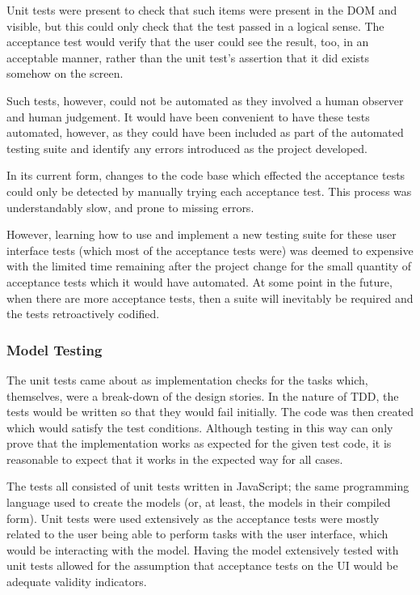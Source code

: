 Unit tests were present to check that such items were present in the DOM and visible, but this could only check that the test passed in a logical sense. The acceptance test would verify that the user could see the result, too, in an acceptable manner, rather than the unit test's assertion that it did exists somehow on the screen.

Such tests, however, could not be automated as they involved a human observer and human judgement. It would have been convenient to have these tests automated, however, as they could have been included as part of the automated testing suite and identify any errors introduced as the project developed.

In its current form, changes to the code base which effected the acceptance tests could only be detected by manually trying each acceptance test. This process was understandably slow, and prone to missing errors.

However, learning how to use and implement a new testing suite for these user interface tests (which most of the acceptance tests were) was deemed to expensive with the limited time remaining after the project change for the small quantity of acceptance tests which it would have automated. At some point in the future, when there are more acceptance tests, then a suite will inevitably be required and the tests retroactively codified.

\subsubsection{Model Testing}
The unit tests came about as implementation checks for the tasks which, themselves, were a break-down of the design stories. In the nature of TDD, the tests would be written so that they would fail initially. The code was then created which would satisfy the test conditions. Although testing in this way can only prove that the implementation works as expected for the given test code, it is reasonable to expect that it works in the expected way for all cases.

The tests all consisted of unit tests written in Java\-Script; the same programming language used to create the models (or, at least, the models in their compiled form). Unit tests were used extensively as the acceptance tests were mostly related to the user being able to perform tasks with the user interface, which would be interacting with the model. Having the model extensively tested with unit tests allowed for the assumption that acceptance tests on the UI would be adequate validity indicators.

